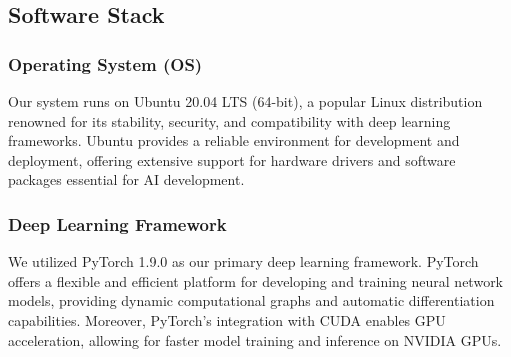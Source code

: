 \subsection{Software Stack}

  \subsubsection{Operating System (OS)}
  Our system runs on Ubuntu 20.04 LTS (64-bit), a popular Linux distribution renowned for its stability, security, and compatibility with deep learning frameworks. Ubuntu provides a reliable environment for development and deployment, offering extensive support for hardware drivers and software packages essential for AI development.
  
  \subsubsection{Deep Learning Framework}
  We utilized PyTorch 1.9.0 as our primary deep learning framework. PyTorch offers a flexible and efficient platform for developing and training neural network models, providing dynamic computational graphs and automatic differentiation capabilities. Moreover, PyTorch's integration with CUDA enables GPU acceleration, allowing for faster model training and inference on NVIDIA GPUs.
  
